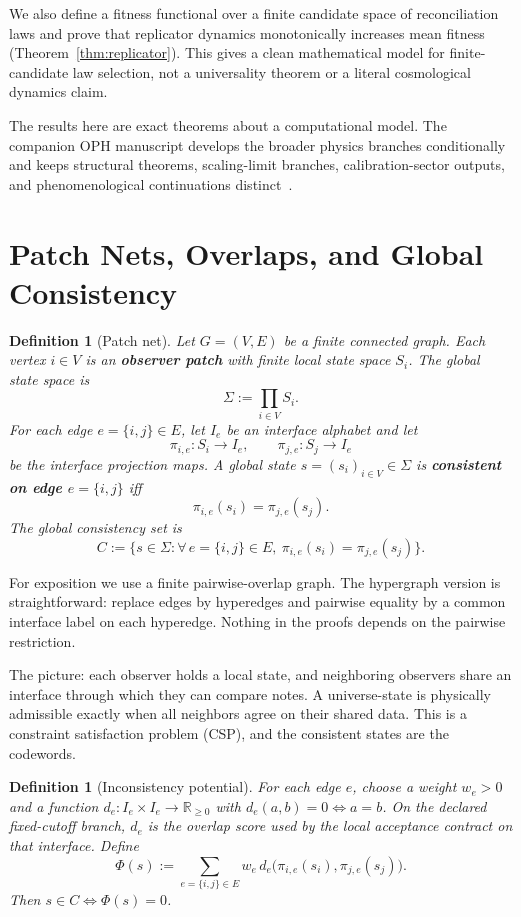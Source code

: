 \documentclass[11pt]{article}
\newtheorem{definition}[theorem]{Definition}
\theoremstyle{remark}
\theoremstyle{plain}
\begin{document}
We also define a fitness functional over a finite candidate space of reconciliation laws and prove
that replicator dynamics monotonically increases mean fitness (Theorem~\ref{thm:replicator}). This
gives a clean mathematical model for finite-candidate law selection, not a universality theorem or
a literal cosmological dynamics claim.

The results here are exact theorems about a computational model. The companion OPH manuscript develops the broader physics branches conditionally and keeps structural theorems, scaling-limit branches, calibration-sector outputs, and phenomenological continuations distinct~\cite{OPH}.


\section{Patch Nets, Overlaps, and Global Consistency}

\begin{definition}[Patch net]\label{def:patchnet}
Let $G=(V,E)$ be a finite connected graph. Each vertex $i\in V$ is an \textbf{observer patch} with finite local state space $S_i$. The global state space is
\[
\Sigma := \prod_{i\in V} S_i.
\]
For each edge $e=\{i,j\}\in E$, let $I_e$ be an interface alphabet and let
\[
\pi_{i,e}:S_i\to I_e,
\qquad
\pi_{j,e}:S_j\to I_e
\]
be the interface projection maps. A global state $s=(s_i)_{i\in V}\in\Sigma$ is \textbf{consistent on edge $e=\{i,j\}$} iff
\[
\pi_{i,e}(s_i)=\pi_{j,e}(s_j).
\]
The global consistency set is
\[
C:=\bigl\{s\in\Sigma:\forall\, e=\{i,j\}\in E,\ \pi_{i,e}(s_i)=\pi_{j,e}(s_j)\bigr\}.
\]
\end{definition}

For exposition we use a finite pairwise-overlap graph. The hypergraph version is straightforward: replace edges by hyperedges and pairwise equality by a common interface label on each hyperedge. Nothing in the proofs depends on the pairwise restriction.

The picture: each observer holds a local state, and neighboring observers share an interface through which they can compare notes. A universe-state is physically admissible exactly when all neighbors agree on their shared data. This is a constraint satisfaction problem (CSP), and the consistent states are the codewords.

\begin{definition}[Inconsistency potential]\label{def:potential}
For each edge $e$, choose a weight $w_e>0$ and a function $d_e:I_e\times I_e\to\mathbb{R}_{\ge 0}$ with $d_e(a,b)=0 \iff a=b$. On the declared fixed-cutoff branch, \(d_e\) is the overlap score used by the local acceptance contract on that interface. Define
\[
\Phi(s)
:=
\sum_{e=\{i,j\}\in E}
w_e\, d_e\!\bigl(\pi_{i,e}(s_i),\pi_{j,e}(s_j)\bigr).
\]
Then $s\in C \iff \Phi(s)=0$.
\end{definition}
\end{document}
